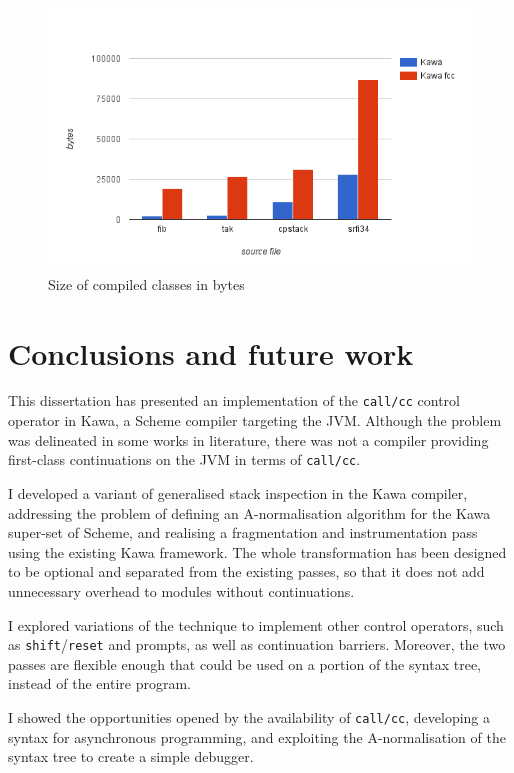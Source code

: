 \documentclass[12pt,a4paper,oneside,openright]{book}
\begin{document}
\begin{figure}[htbp]
\centering
\includegraphics{figures/codesize.png}
\caption{Size of compiled classes in bytes \label{codesize}}
\end{figure}

\chapter{Conclusions and future work}\label{conclusions-and-future-work}

This dissertation has presented an implementation of the
\texttt{call/cc} control operator in Kawa, a Scheme compiler targeting
the JVM. Although the problem was delineated in some works in
literature, there was not a compiler providing first-class continuations
on the JVM in terms of \texttt{call/cc}.

I developed a variant of generalised stack inspection in the Kawa
compiler, addressing the problem of defining an A-normalisation
algorithm for the Kawa super-set of Scheme, and realising a
fragmentation and instrumentation pass using the existing Kawa
framework. The whole transformation has been designed to be optional and
separated from the existing passes, so that it does not add unnecessary
overhead to modules without continuations.

I explored variations of the technique to implement other control
operators, such as \texttt{shift}/\texttt{reset} and prompts, as well as
continuation barriers. Moreover, the two passes are flexible enough that
could be used on a portion of the syntax tree, instead of the entire
program.

I showed the opportunities opened by the availability of
\texttt{call/cc}, developing a syntax for asynchronous programming, and
exploiting the A-normalisation of the syntax tree to create a simple
debugger.
\end{document}
